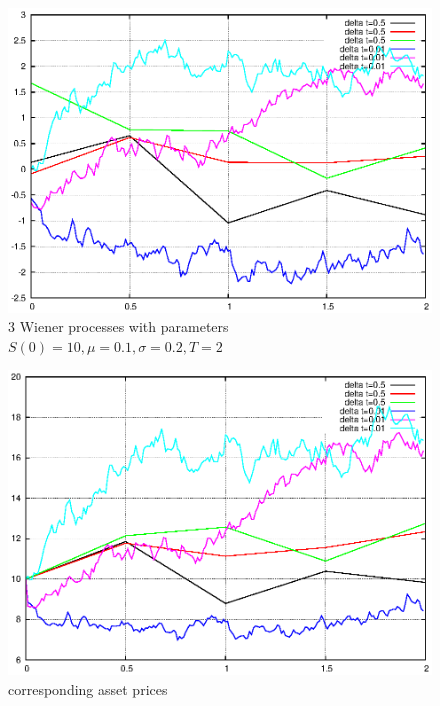 \documentclass[]{article}
\begin{document}
\begin{figure}[!ht]
\includegraphics{task10_w}
\caption{3 Wiener processes with parameters $S(0)=10,\mu=0.1,\sigma=0.2,T=2$}
\label{fig:Task10a}
\end{figure}

\begin{figure}[!ht]
\includegraphics{task10_s}
\caption{corresponding asset prices}
\label{fig:Task10b}
\end{figure}
\clearpage
\end{document}
